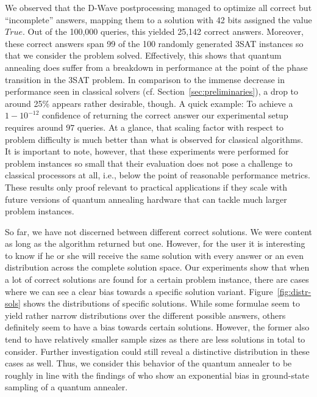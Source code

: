 We observed that the D-Wave postprocessing managed to optimize all correct but ``incomplete'' answers, mapping them to a solution with 42 bits assigned the value $\textit{True}$. Out of the 100,000 queries, this yielded 25,142 correct answers. Moreover, these correct answers span 99 of the 100 randomly generated 3SAT instances so that we consider the problem solved. Effectively, this shows that quantum annealing does suffer from a breakdown in performance at the point of the phase transition in the 3SAT problem. In comparison to the immense decrease in performance seen in classical solvers (cf. Section~\ref{sec:preliminaries}), a drop to around 25\% appears rather desirable, though. A quick example: To achieve a $1 - 10^{-12}$ confidence of returning the correct answer our experimental setup requires around $97$ queries. At a glance, that scaling factor with respect to problem difficulty is much better than what is observed for classical algorithms. It is important to note, however, that these experiments were performed for problem instances so small that their evaluation does not pose a challenge to classical processors at all, i.e., below the point of reasonable performance metrics. These results only proof relevant to practical applications if they scale with future versions of quantum annealing hardware that can tackle much larger problem instances.

So far, we have not discerned between different correct solutions. We were content as long as the algorithm returned but one. However, for the user it is interesting to know if he or she will receive the same solution with every answer or an even distribution across the complete solution space. Our experiments show that when a lot of correct solutions are found for a certain problem instance, there are cases where we can see a clear bias towards a specific solution variant. Figure~\ref{fig:distr-sols} shows the distributions of specific solutions. While some formulae seem to yield rather narrow distributions over the different possible answers, others definitely seem to have a bias towards certain solutions. However, the former also tend to have relatively smaller sample sizes as there are less solutions in total to consider. Further investigation could still reveal a distinctive distribution in these cases as well. Thus, we consider this behavior of the quantum annealer to be roughly in line with the findings of \cite{mandra2017exponentially} who show an exponential bias in ground-state sampling of a quantum annealer.

